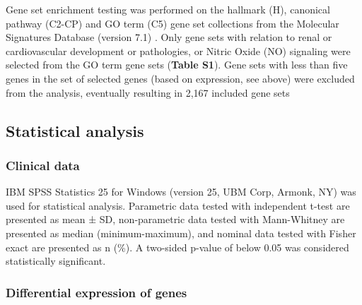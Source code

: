 \documentclass[authordate, empirical]{jote-new-article}
\begin{document}
	Gene set enrichment testing was performed on the hallmark (H), canonical pathway (C2-CP) and GO term (C5) gene set collections from the Molecular Signatures Database (version 7.1) \parencites{Wu2012}{Liberzon2016}. Only gene sets with relation to renal or cardiovascular development or pathologies, or Nitric Oxide (NO) signaling were selected from the GO term gene sets (\textbf{Table S1}). Gene sets with less than five genes in the set of selected genes (based on expression, see above) were excluded from the analysis, eventually resulting in 2,167 included gene sets







	\subsection{Statistical analysis}



	\subsubsection{Clinical data}



	IBM SPSS Statistics 25 for Windows (version 25, UBM Corp, Armonk, NY) was used for statistical analysis. Parametric data tested with independent t-test are presented as mean ± SD, non-parametric data tested with Mann-Whitney are presented as median (minimum-maximum), and nominal data tested with Fisher exact are presented as n (\%). A two-sided p-value of below 0.05 was considered statistically significant.







	\subsubsection{Differential expression of genes}
\end{document}
